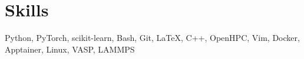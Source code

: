 \section{Skills}
Python, PyTorch, scikit-learn, Bash, Git, \LaTeX, C++, OpenHPC, Vim, Docker, Apptainer, Linux, VASP, LAMMPS %
